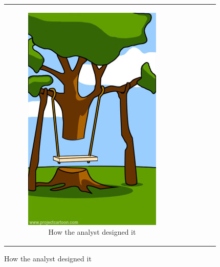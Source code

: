 \begin{figure}[h]
\begin{center}
\begin{tabular}{|c|c|c|c|c|c|}
\begin{subfigure}[t]{0.15\textwidth}\centering\includegraphics[width=0.9\columnwidth]{images/howdesigned}
\caption*{\tiny \centering How the analyst designed it}\label{fig:howdesigned}\end{subfigure}&

\end{tabular}
\end{center}
\end{figure}
